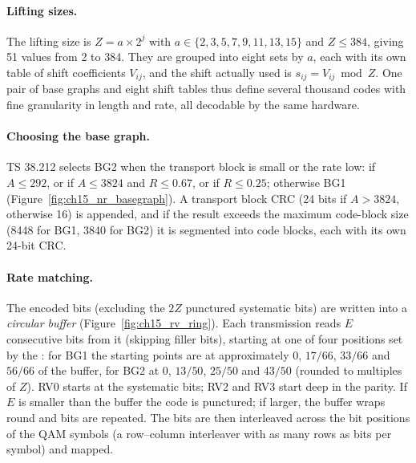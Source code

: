 \paragraph{Lifting sizes.} The lifting size is $Z=a\times2^j$ with
$a\in\{2,3,5,7,9,11,13,15\}$ and $Z\le384$, giving 51 values from 2 to 384. They are grouped into eight
sets by $a$, each with its own table of shift coefficients $V_{ij}$, and the shift actually used is
$s_{ij}=V_{ij}\bmod Z$. One pair of base graphs and eight shift tables thus define several thousand
codes with fine granularity in length and rate, all decodable by the same hardware.

\paragraph{Choosing the base graph.} TS 38.212 selects BG2 when the transport block is small or the
rate low: if $A\le292$, or if $A\le3824$ and $R\le0.67$, or if $R\le0.25$; otherwise BG1
(Figure~\ref{fig:ch15_nr_basegraph}). A transport block CRC (24 bits if $A>3824$, otherwise 16) is
appended, and if the result exceeds the maximum code-block size (8448 for BG1, 3840 for BG2) it is
segmented into code blocks, each with its own 24-bit CRC.


\paragraph{Rate matching.} The encoded bits (excluding the $2Z$ punctured systematic bits) are
written into a \emph{circular buffer} (Figure~\ref{fig:ch15_rv_ring}). Each transmission reads $E$
consecutive bits from it (skipping filler bits), starting at one of four positions set by the
: for BG1 the starting points are at approximately $0$, $17/66$, $33/66$ and
$56/66$ of the buffer, for BG2 at $0$, $13/50$, $25/50$ and $43/50$ (rounded to multiples of $Z$). RV0
starts at the systematic bits; RV2 and RV3 start deep in the parity. If $E$ is smaller than the
buffer the code is punctured; if larger, the buffer wraps round and bits are repeated. The bits are
then interleaved across the bit positions of the QAM symbols (a row--column interleaver with as many
rows as bits per symbol) and mapped.

